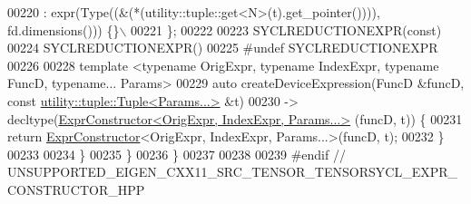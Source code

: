 \begin{DoxyCode}
00220 \textcolor{preprocessor}{  : expr(Type((&(*(utility::tuple::get<N>(t).get\_pointer()))), fd.dimensions())) \{\}\(\backslash\)}
00221 \textcolor{preprocessor}{\};}
00222 
00223 SYCLREDUCTIONEXPR(\textcolor{keyword}{const})
00224 SYCLREDUCTIONEXPR()
00225 \textcolor{preprocessor}{#undef SYCLREDUCTIONEXPR}
00226 
00228 \textcolor{keyword}{template} <\textcolor{keyword}{typename} OrigExpr, \textcolor{keyword}{typename} IndexExpr, \textcolor{keyword}{typename} FuncD, \textcolor{keyword}{typename}... Params>
00229 \textcolor{keyword}{auto} createDeviceExpression(FuncD &funcD, \textcolor{keyword}{const} \hyperlink{structutility_1_1tuple_1_1_tuple}{utility::tuple::Tuple<Params...>}
       &t)
00230     -> decltype(\hyperlink{struct_eigen_1_1_tensor_sycl_1_1internal_1_1_expr_constructor}{ExprConstructor<OrigExpr, IndexExpr, Params...>}
      (funcD, t)) \{
00231   \textcolor{keywordflow}{return} \hyperlink{struct_eigen_1_1_tensor_sycl_1_1internal_1_1_expr_constructor}{ExprConstructor}<OrigExpr, IndexExpr, Params...>(funcD, t);
00232 \}
00233 
00234 \} 
00235 \} 
00236 \} 
00237 
00238 
00239 \textcolor{preprocessor}{#endif  // UNSUPPORTED\_EIGEN\_CXX11\_SRC\_TENSOR\_TENSORSYCL\_EXPR\_CONSTRUCTOR\_HPP}
\end{DoxyCode}

